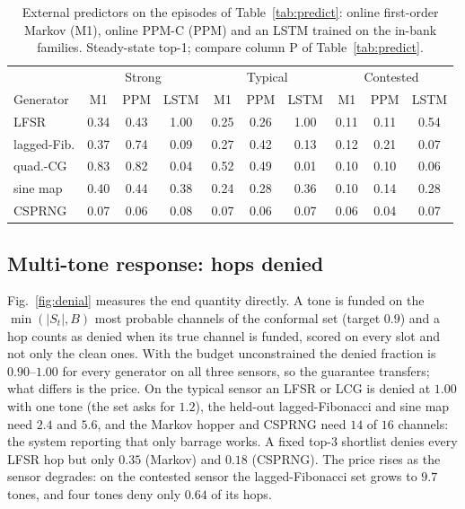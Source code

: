 \documentclass[conference]{IEEEtran}
\begin{document}
\begin{table}[t]
\centering
\caption{External predictors on the episodes of Table~\ref{tab:predict}:
online first-order Markov (M1), online PPM-C (PPM) and an LSTM trained on the
in-bank families. Steady-state top-1; compare column P of
Table~\ref{tab:predict}.}
\label{tab:predbase}
\setlength{\tabcolsep}{2.4pt}
\footnotesize
\begin{tabular}{@{}lccccccccc@{}}
\toprule
 & \multicolumn{3}{c}{Strong} & \multicolumn{3}{c}{Typical} & \multicolumn{3}{c}{Contested} \\
Generator & M1 & PPM & LSTM & M1 & PPM & LSTM & M1 & PPM & LSTM \\
\midrule
LFSR        & 0.34 & 0.43 & 1.00 & 0.25 & 0.26 & 1.00 & 0.11 & 0.11 & 0.54 \\
lagged-Fib. & 0.37 & 0.74 & 0.09 & 0.27 & 0.42 & 0.13 & 0.12 & 0.21 & 0.07 \\
quad.-CG    & 0.83 & 0.82 & 0.04 & 0.52 & 0.49 & 0.01 & 0.10 & 0.10 & 0.06 \\
sine map    & 0.40 & 0.44 & 0.38 & 0.24 & 0.28 & 0.36 & 0.10 & 0.14 & 0.28 \\
CSPRNG      & 0.07 & 0.06 & 0.08 & 0.07 & 0.06 & 0.07 & 0.06 & 0.04 & 0.07 \\
\bottomrule
\end{tabular}
\end{table}

\subsection{Multi-tone response: hops denied}
Fig.~\ref{fig:denial} measures the end quantity directly. A tone is funded on
the $\min(|S_t|,B)$ most probable channels of the conformal set (target
$0.9$) and a hop counts as denied when its true channel is funded, scored on
every slot and not only the clean ones. With the budget unconstrained the
denied fraction is $0.90$--$1.00$ for every generator on all three sensors,
so the guarantee transfers; what differs is the price. On the typical sensor
an LFSR or LCG is denied at $1.00$ with one tone (the set asks for $1.2$), the
held-out lagged-Fibonacci and sine map need $2.4$ and $5.6$, and the Markov
hopper and CSPRNG need $14$ of $16$ channels: the system reporting that only
barrage works. A fixed top-3 shortlist denies every LFSR hop but only $0.35$
(Markov) and $0.18$ (CSPRNG). The price rises as the sensor degrades: on the
contested sensor the lagged-Fibonacci set grows to $9.7$ tones, and four tones
deny only $0.64$ of its hops.
\end{document}
